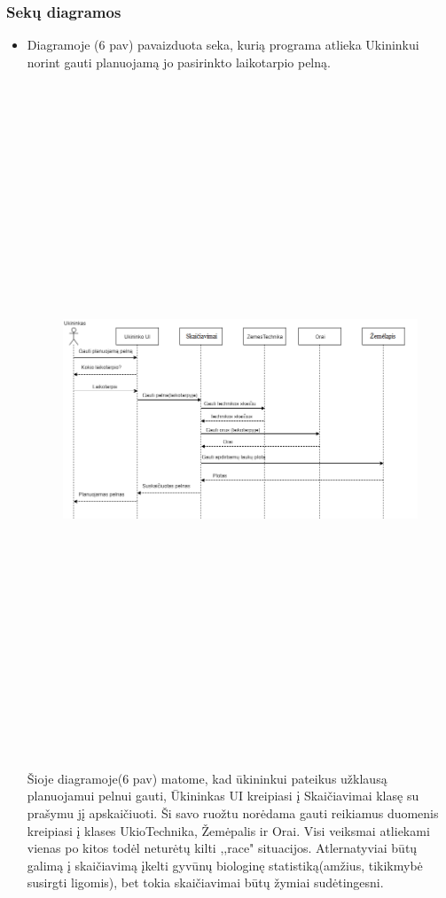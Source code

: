 \documentclass[oneside]{VUMIFPSkursinis}
\begin{document}
\subsubsection{Sekų diagramos}
\begin{itemize}
\item Diagramoje (6 pav)  pavaizduota seka, kurią programa atlieka Ukininkui norint gauti planuojamą jo pasirinkto laikotarpio pelną.
		\begin{figure}[H]
		\centering	
	\includegraphics[width=17cm,height=20cm,keepaspectratio]{PelnoSkaičiavimas.png}
	\caption{}
	\label{fig:PelnoSkaičiavimas}
\end{figure}
Šioje diagramoje(6 pav) matome, kad ūkininkui pateikus užklausą planuojamui pelnui gauti, Ūkininkas UI kreipiasi į Skaičiavimai klasę su prašymu jį apskaičiuoti. Ši savo ruožtu norėdama gauti reikiamus duomenis kreipiasi į klases UkioTechnika, Žemėpalis ir Orai. Visi veiksmai atliekami vienas po kitos todėl neturėtų kilti ,,race" situacijos. Atlernatyviai būtų galimą į skaičiavimą įkelti gyvūnų biologinę statistiką(amžius, tikikmybė susirgti ligomis), bet tokia skaičiavimai būtų žymiai sudėtingesni.


\end{itemize}
\end{document}

